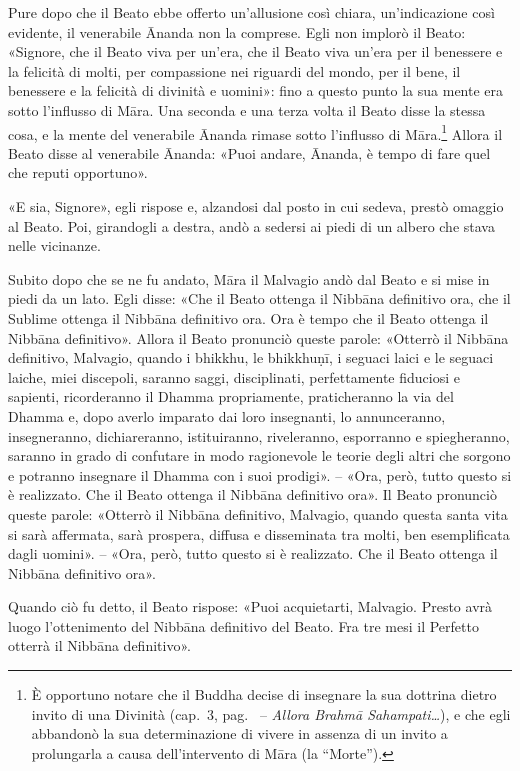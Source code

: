 Pure dopo che il Beato ebbe offerto un’allusione così chiara, un’indicazione
così evidente, il venerabile Ānanda non la comprese. Egli non implorò il Beato:
«Signore, che il Beato viva per un’era, che il Beato viva un’era per il
benessere e la felicità di molti, per compassione nei riguardi del mondo, per il
bene, il benessere e la felicità di divinità e uomini»: fino a questo punto la
sua mente era sotto l’influsso di Māra. Una seconda e una terza volta il Beato
disse la stessa cosa, e la mente del venerabile Ānanda rimase sotto l’influsso
di Māra.\footnote{%
  È opportuno notare che il Buddha decise di insegnare la sua dottrina dietro
  invito di una Divinità (cap.~3, pag.~\pageref{pag45} -- \emph{Allora Brahmā
    Sahampati\ldots}), e che egli abbandonò la sua determinazione di vivere in
  assenza di un invito a prolungarla a causa dell’intervento di Māra (la
  “Morte”).}
Allora il Beato disse al venerabile Ānanda: «Puoi andare, Ānanda, è tempo di
fare quel che reputi opportuno».

«E sia, Signore», egli rispose e, alzandosi dal posto in cui sedeva, prestò
omaggio al Beato. Poi, girandogli a destra, andò a sedersi ai piedi di un albero
che stava nelle vicinanze.

Subito dopo che se ne fu andato, Māra il Malvagio andò dal Beato e si mise in
piedi da un lato. Egli disse: «Che il Beato ottenga il Nibbāna definitivo ora,
che il Sublime ottenga il Nibbāna definitivo ora. Ora è tempo che il Beato
ottenga il Nibbāna definitivo». Allora il Beato pronunciò queste parole:
«Otterrò il Nibbāna definitivo, Malvagio, quando i bhikkhu, le bhikkhuṇī, i
seguaci laici e le seguaci laiche, miei discepoli, saranno saggi, disciplinati,
perfettamente fiduciosi e sapienti, ricorderanno il Dhamma propriamente,
praticheranno la via del Dhamma e, dopo averlo imparato dai loro insegnanti, lo
annunceranno, insegneranno, dichiareranno, istituiranno, riveleranno, esporranno
e spiegheranno, saranno in grado di confutare in modo ragionevole le teorie
degli altri che sorgono e potranno insegnare il Dhamma con i suoi prodigi». –
«Ora, però, tutto questo si è realizzato. Che il Beato ottenga il Nibbāna
definitivo ora». Il Beato pronunciò queste parole: «Otterrò il Nibbāna
definitivo, Malvagio, quando questa santa vita si sarà affermata, sarà prospera,
diffusa e disseminata tra molti, ben esemplificata dagli uomini». – «Ora, però,
tutto questo si è realizzato. Che il Beato ottenga il Nibbāna definitivo ora».

Quando ciò fu detto, il Beato rispose: «Puoi acquietarti, Malvagio. Presto avrà
luogo l’ottenimento del Nibbāna definitivo del Beato. Fra tre mesi il Perfetto
otterrà il Nibbāna definitivo».

